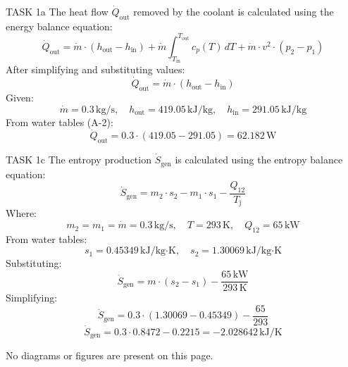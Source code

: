 TASK 1a  
The heat flow \( \dot{Q}_{\text{out}} \) removed by the coolant is calculated using the energy balance equation:  
\[
\dot{Q}_{\text{out}} = \dot{m} \cdot (h_{\text{out}} - h_{\text{in}}) + \dot{m} \int_{T_{\text{in}}}^{T_{\text{out}}} c_p(T) \, dT + \dot{m} \cdot v^2 \cdot (p_2 - p_1)
\]  
After simplifying and substituting values:  
\[
\dot{Q}_{\text{out}} = \dot{m} \cdot (h_{\text{out}} - h_{\text{in}})
\]  
Given:  
\[
\dot{m} = 0.3 \, \text{kg/s}, \quad h_{\text{out}} = 419.05 \, \text{kJ/kg}, \quad h_{\text{in}} = 291.05 \, \text{kJ/kg}
\]  
From water tables (A-2):  
\[
\dot{Q}_{\text{out}} = 0.3 \cdot (419.05 - 291.05) = 62.182 \, \text{W}
\]  

TASK 1c  
The entropy production \( \dot{S}_{\text{gen}} \) is calculated using the entropy balance equation:  
\[
\dot{S}_{\text{gen}} = m_2 \cdot s_2 - m_1 \cdot s_1 - \frac{Q_{12}}{T_{\text{j}}}
\]  
Where:  
\[
m_2 = m_1 = \dot{m} = 0.3 \, \text{kg/s}, \quad T = 293 \, \text{K}, \quad Q_{12} = 65 \, \text{kW}
\]  
From water tables:  
\[
s_1 = 0.45349 \, \text{kJ/kg·K}, \quad s_2 = 1.30069 \, \text{kJ/kg·K}
\]  
Substituting:  
\[
\dot{S}_{\text{gen}} = m \cdot (s_2 - s_1) - \frac{65 \, \text{kW}}{293 \, \text{K}}
\]  
Simplifying:  
\[
\dot{S}_{\text{gen}} = 0.3 \cdot (1.30069 - 0.45349) - \frac{65}{293}
\]  
\[
\dot{S}_{\text{gen}} = 0.3 \cdot 0.8472 - 0.2215 = -2.028642 \, \text{kJ/K}
\]  

No diagrams or figures are present on this page.